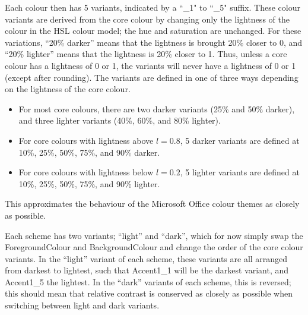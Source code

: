 \documentclass[]{article}
\begin{document}
  Each colour then has 5 variants, indicated by a ``\_1" to ``\_5" suffix. These colour variants are derived from the core colour by changing only the lightness of the colour in the HSL colour model; the hue and saturation are unchanged. For these variations, ``20\% darker'' means that the lightness is brought 20\% closer to 0, and ``20\% lighter'' means that the lightness is 20\% closer to 1. Thus, unless a core colour has a lightness of 0 or 1, the variants will never have a lightness of 0 or 1 (except after rounding). The variants are defined in one of three ways depending on the lightness of the core colour.
  \begin{itemize}
      \item For most core colours, there are two darker variants (25\% and 50\% darker), and three lighter variants (40\%, 60\%, and 80\% lighter).
      \item For core colours with lightness above $l = 0.8$, 5 darker variants are defined at 10\%, 25\%, 50\%, 75\%, and 90\% darker.
      \item For core colours with lightness below $l = 0.2$, 5 lighter variants are defined at 10\%, 25\%, 50\%, 75\%, and 90\% lighter.
  \end{itemize}
  This approximates the behaviour of the Microsoft Office colour themes as closely as possible.

  Each scheme has two variants; ``light'' and ``dark'', which for now simply swap the ForegroundColour and BackgroundColour and change the order of the core colour variants. In the ``light'' variant of each scheme, these variants are all arranged from darkest to lightest, such that Accent1\_1 will be the darkest variant, and Accent1\_5 the lightest. In the ``dark'' variants of each scheme, this is reversed; this should mean that relative contrast is conserved as closely as possible when switching between light and dark variants.

\end{document}
